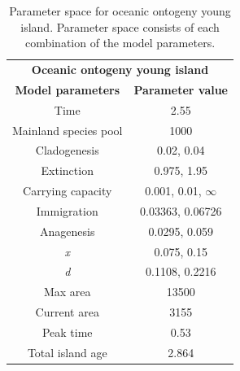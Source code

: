 \begin{table}[ht]
    \centering
    \caption{Parameter space for oceanic ontogeny young island. Parameter space consists of each combination of the model parameters.}
    \begin{tabular}{ c | c }
        \multicolumn{2}{c}{\textbf{Oceanic ontogeny young island}} \\
        \textbf{Model parameters} & \textbf{Parameter value} \\ 
        \hline
        \hline
        Time & 2.55 \\
        \hline
        Mainland species pool & 1000 \\
        \hline
        Cladogenesis & 0.02, 0.04 \\
        \hline
        Extinction & 0.975, 1.95 \\
        \hline
        Carrying capacity & 0.001, 0.01, $\infty$ \\
        \hline
        Immigration & 0.03363, 0.06726 \\
        \hline
        Anagenesis & 0.0295, 0.059 \\
        \hline
        \textit{x} & 0.075, 0.15 \\
        \hline
        \textit{d} & 0.1108, 0.2216 \\
        \hline
        Max area & 13500 \\
        \hline
        Current area & 3155 \\
        \hline
        Peak time & 0.53 \\
        \hline
        Total island age & 2.864 \\
    \end{tabular}
    \label{tab:oceanic_ontogeny_young}
\end{table}

